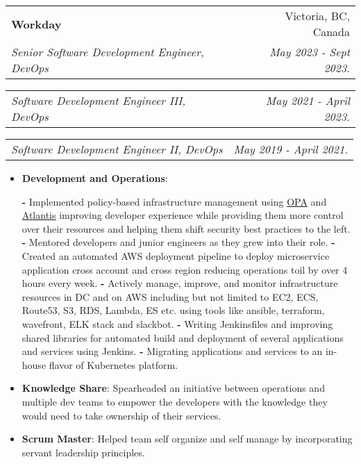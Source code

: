 \documentclass[letterpaper,11pt]{article}
\makeatletter
\newcommand{\resumeItem}[2]{
\item\small{
\textbf{#1}{: #2 \vspace{-2pt}}
}
}
\newcommand{\resumeSubheading}[4]{
\vspace{-1pt}\item
\begin{tabular*}{0.97\textwidth}[t]{l@{\extracolsep{\fill}}r}
    \textbf{#1}       & #2                 \\
    \textit{\small#3} & \textit{\small #4} \\
\end{tabular*}\vspace{-3pt}
}
\newcommand{\resumeSubSubheading}[2]{
    \vspace{3pt}
    \begin{tabular*}{0.97\textwidth}{l@{\extracolsep{\fill}}r}
      \textit{\small#1} & \textit{\small #2} \\
    \end{tabular*}\vspace{-5pt}
}
\newcommand{\resumeItemListStart}{\begin{itemize}}
\newcommand{\resumeItemListEnd}{\end{itemize}\vspace{-5pt}}
\makeatother
\begin{document}
\resumeSubheading
{Workday}{Victoria, BC, Canada}
{Senior Software Development Engineer, DevOps}{May 2023 - Sept 2023.}
\resumeSubSubheading
{Software Development Engineer III, DevOps}{May 2021 - April 2023.}
\resumeSubSubheading
{Software Development Engineer II, DevOps}{May 2019 - April 2021.}
\resumeItemListStart
\resumeItem{Development and Operations}{}
\newline
{\textbf{-} Implemented policy-based infrastructure management using 
\href{https://www.openpolicyagent.org/}{OPA} and \href{https://www.runatlantis.io/}{Atlantis} 
improving developer experience while providing them more control over their resources and helping them shift 
security best practices to the left.}
\newline
{\textbf{-} Mentored developers and junior engineers as they grew into their role.}
\newline
{\textbf{-} Created an automated AWS deployment pipeline to deploy microservice application cross account and cross region
reducing operations toil by over 4 hours every week.}
\newline
{\textbf{-} Actively manage, improve, and monitor infrastructure resources in DC and on AWS including but not limited to
EC2, ECS, Route53, S3, RDS, Lambda, ES etc. using tools like ansible, terraform, wavefront, ELK stack and slackbot.}
\newline
{\textbf{-} Writing Jenkinsfiles and improving shared libraries for automated build and deployment of several applications and services using Jenkins.}
\newline
{\textbf{-} Migrating applications and services to an in-house flavor of Kubernetes platform.}
\resumeItem{Knowledge Share}{Spearheaded an initiative between operations and multiple dev teams to empower the developers with the knowledge
they would need to take ownership of their services.}
\resumeItem{Scrum Master}{Helped team self organize and self manage by incorporating servant leadership principles.}
\resumeItemListEnd
\end{document}
